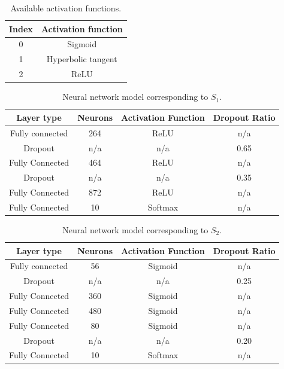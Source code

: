 \documentclass[journal]{IEEEtran}
\begin{document}
\begin{table}[!htb]
\begin{center}
\begin{tabular}{| c | c |}
\hline
Index & Activation function \\
\hline
0 & Sigmoid \\
1 & Hyperbolic tangent \\
2 & ReLU \\
\hline
\end{tabular}
\end{center}
\caption{Available activation functions.}
\label{table:index_to_activation_functions}
\end{table}

\begin{table}[!htb]
\begin{center}
\begin{tabular}{| c | c | c | c |}
\hline
Layer type & Neurons & Activation Function & Dropout Ratio \\
\hline
Fully connected & 264 & ReLU & n/a \\
Dropout & n/a & n/a & 0.65 \\
Fully Connected & 464 & ReLU & n/a\\
Dropout & n/a & n/a & 0.35\\
Fully Connected & 872 & ReLU & n/a\\
Fully Connected & 10 & Softmax & n/a\\
\hline
\end{tabular}
\end{center}
\caption{Neural network model corresponding to $S_1$.}
\label{table:neural_network_model_S1}
\end{table}

\begin{table}[!htb]
\begin{center}
\begin{tabular}{| c | c | c | c |}
\hline
Layer type & Neurons & Activation Function & Dropout Ratio \\
\hline
Fully connected & 56 & Sigmoid & n/a \\
Dropout & n/a & n/a & 0.25 \\
Fully Connected & 360 & Sigmoid & n/a\\
Fully Connected & 480 & Sigmoid & n/a\\
Fully Connected & 80 & Sigmoid & n/a\\
Dropout & n/a & n/a & 0.20\\
Fully Connected & 10 & Softmax & n/a\\
\hline
\end{tabular}
\end{center}
\caption{Neural network model corresponding to $S_2$.}
\label{table:neural_network_model_S2}
\end{table}
\end{document}

